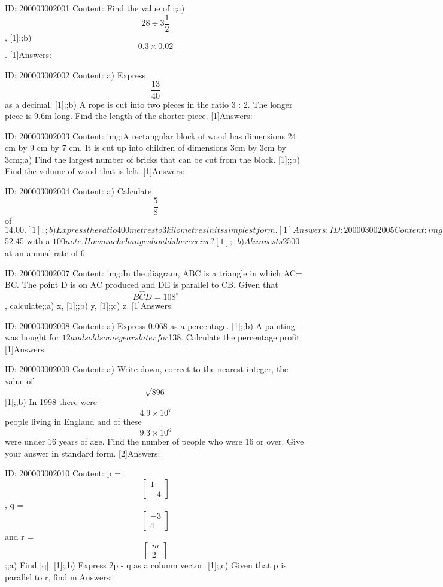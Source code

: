 \documentclass{article}
\begin{document}
ID: 200003002001
Content:
Find the value of ;;a) $$28 \div 3 \frac{1}{2}$$, [1];;b) $$0.3 \times 0.02$$. [1]Answers:

ID: 200003002002
Content:
a) Express $$\frac{13}{40}$$ as a decimal. [1];;b) A rope is cut into two pieces in the ratio 3 : 2. The longer piece is 9.6m long. Find the length of the shorter piece. [1]Answers:

ID: 200003002003
Content:
img;A rectangular block of wood has dimensions 24 cm by 9 cm by 7 cm. It is cut up into children of dimensions 3cm by 3cm by 3cm;;a) Find the largest number of bricks that can be cut from the block. [1];;b) Find the volume of wood that is left. [1]Answers:

ID: 200003002004
Content:
a) Calculate $$\frac{5}{8}$$ of $14.00. [1];;b) Express the ratio 400 metres to 3 kilometres in its simplest form. [1]Answers:

ID: 200003002005
Content:
img;The diagram is taken from an advertisement of a car manufacturer. It claims to show that the number of cars produced has doubled between 1990 and 1999. Explain briefly why the advertisement might be considered misleading. [2]Answers:

ID: 200003002006
Content:
a) Kim pays a bill for $52.45 with a $100 note. How much change should she receive? [1];;b) Ali invests $2500 at an annual rate of 6%

ID: 200003002007
Content:
img;In the diagram, ABC is a triangle in which AC= BC. The point D is on AC produced and DE is parallel to CB. Given that $$B \hat CD = 108^{\circ}$$, calculate;;a) x, [1];;b) y, [1];;c) z. [1]Answers:

ID: 200003002008
Content:
a) Express 0.068 as a percentage. [1];;b) A painting was bought for $12 and sold some years later for $138. Calculate the percentage profit. [1]Answers:

ID: 200003002009
Content:
a) Write down, correct to the nearest integer, the value of $$\sqrt{896}$$[1];;b) In 1998 there were $$4.9 \times 10^7$$ people living in England and of these $$9.3 \times 10^6$$ were under 16 years of age. Find the number of people who were 16 or over. Give your answer in standard form. [2]Answers:

ID: 200003002010
Content:
p = $$\begin{bmatrix}1\\-4\end{bmatrix}$$, q = $$\begin{bmatrix}-3\\4\end{bmatrix}$$ and r = $$\begin{bmatrix}m\\2\end{bmatrix}$$;;a) Find |q|. [1];;b) Express 2p - q as a column vector. [1];;c) Given that p is parallel to r, find m.Answers:
\end{document}

